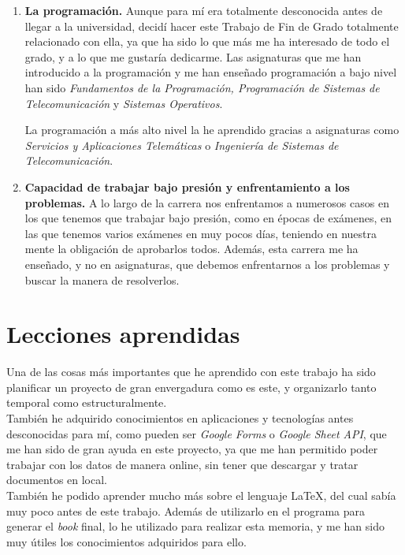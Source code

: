 \documentclass[a4paper, 12pt]{book}
\begin{document}
\begin{enumerate}
  \item \textbf{La programación.} Aunque para mí era totalmente desconocida antes de llegar a la universidad, decidí hacer este Trabajo de Fin de Grado totalmente relacionado con ella, ya que ha sido lo que más me ha interesado de todo el grado, y a lo que me gustaría dedicarme. Las asignaturas que me han introducido a la programación y me han enseñado programación a bajo nivel han sido \textit{Fundamentos de la Programación, Programación de Sistemas de Telecomunicación} y \textit{Sistemas Operativos}.
  
  La programación a más alto nivel la he aprendido gracias a asignaturas como \textit{Servicios y Aplicaciones Telemáticas} o \textit{Ingeniería de Sistemas de Telecomunicación}.
  \item \textbf{Capacidad de trabajar bajo presión y enfrentamiento a los problemas.} A lo largo de la carrera nos enfrentamos a numerosos casos en los que tenemos que trabajar bajo presión, como en épocas de exámenes, en las que tenemos varios exámenes en muy pocos días, teniendo en nuestra mente la obligación de aprobarlos todos. Además, esta carrera me ha enseñado, y no en asignaturas, que debemos enfrentarnos a los problemas y buscar la manera de resolverlos.
\end{enumerate}


\section{Lecciones aprendidas}
\label{sec:lecciones_aprendidas}
Una de las cosas más importantes que he aprendido con este trabajo ha sido planificar un proyecto de gran envergadura como es este, y organizarlo tanto temporal como estructuralmente.\\

También he adquirido conocimientos en aplicaciones y tecnologías antes desconocidas para mí, como pueden ser \textit{Google Forms} o \textit{Google Sheet API}, que me han sido de gran ayuda en este proyecto, ya que me han permitido poder trabajar con los datos de manera online, sin tener que descargar y tratar documentos en local.\\

También he podido aprender mucho más sobre el lenguaje \LaTeX, del cual sabía muy poco antes de este trabajo. Además de utilizarlo en el programa para generar el \textit{book} final, lo he utilizado para realizar esta memoria, y me han sido muy útiles los conocimientos adquiridos para ello.\\
\end{document}
